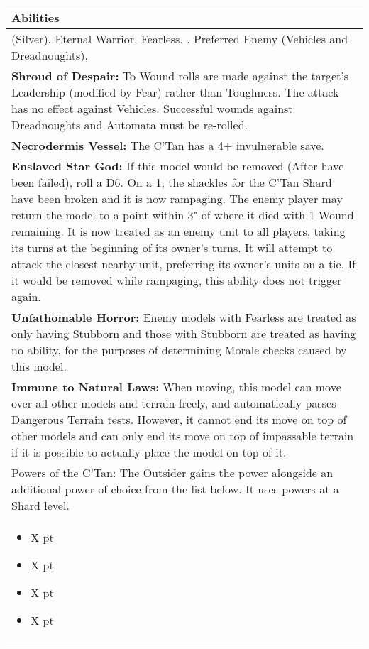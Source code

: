 \noindent
\begin{tabular}{||m{532pt}||}
	\hline
	Abilities \\
	\hline
	\quickref{Awakening Protocols} (Silver), Eternal Warrior, Fearless, \quickref{Living Metal}, Preferred Enemy (Vehicles and Dreadnoughts), \quickref{Reanimation Protocols} \\
	\textbf{Shroud of Despair:} To Wound rolls are made against the target's Leadership (modified by Fear) rather than Toughness. The attack has no effect against Vehicles. Successful wounds against Dreadnoughts and Automata must be re-rolled. \\
	\textbf{Necrodermis Vessel:} The C'Tan has a 4+ invulnerable save. \\
	\textbf{Enslaved Star God:} If this model would be removed (After \quickref{Reanimation Protocols} have been failed), roll a D6. On a 1, the shackles for the C'Tan Shard have been broken and it is now rampaging. The enemy player may return the model to a point within 3" of where it died with 1 Wound remaining. It is now treated as an enemy unit to all players, taking its turns at the beginning of its owner's turns. It will attempt to attack the closest nearby unit, preferring its owner's units on a tie. If it would be removed while rampaging, this ability does not trigger again. \\
	\textbf{Unfathomable Horror:} Enemy models with Fearless are treated as only having Stubborn and those with Stubborn are treated as having no ability, for the purposes of determining Morale checks caused by this model. \\
	\textbf{Immune to Natural Laws:} When moving, this model can move over all other models and terrain freely, and automatically passes Dangerous Terrain tests. However, it cannot end its move on top of other models and can only end its move on top of impassable terrain if it is possible to actually place the model on top of it. \\
	Powers of the C'Tan: The Outsider gains the \quickref{Gaze of the Abyss} power alongside an additional power of choice from the list below. It uses powers at a Shard level. \\
	\begin{itemize}
		\item \quickref{Antimatter Meteor} \hrulefill X pt
		\item \quickref{Cosmic Fire} \hrulefill X pt
		\item \quickref{Entropic Touch} \hrulefill X pt
		\item \quickref{Moulder of Worlds} \hrulefill X pt

\end{itemize}
\end{tabular}
